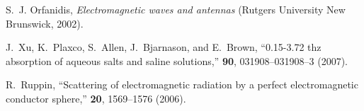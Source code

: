 \documentclass{osa-article}
\begin{document}
\begin{thebibliography}{10}
S.~J. Orfanidis, \emph{Electromagnetic waves and antennas} (Rutgers University
  New Brunswick, 2002).

J.~Xu, K.~Plaxco, S.~Allen, J.~Bjarnason, and E.~Brown, \enquote{0.15-3.72 thz
  absorption of aqueous salts and saline solutions,}
  {\protect{}} \textbf{90},
  031908–031908--3 (2007).

R.~Ruppin, \enquote{Scattering of electromagnetic radiation by a perfect
  electromagnetic conductor sphere,} {\protect{}} \textbf{20}, 1569--1576 (2006).

\end{thebibliography}

%




\end{document}
